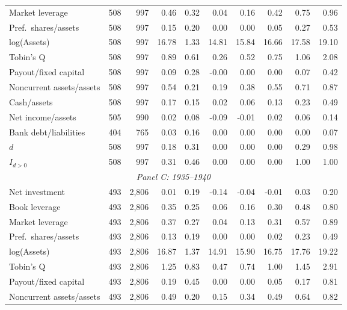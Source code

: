 \begin{table}[p]
\begin{tabular}{lrrrrrrrrr}
Market leverage             & 508 &   997 & 0.46 & 0.32 &  0.04 &  0.16 &  0.42 &  0.75 & 0.96 \\
Pref.\ shares/assets        & 508 &   997 & 0.15 & 0.20 &  0.00 &  0.00 &  0.05 &  0.27 & 0.53 \\
log(Assets)                 & 508 &   997 & 16.78& 1.33 & 14.81 & 15.84 & 16.66 & 17.58 & 19.10 \\
Tobin's Q                   & 508 &   997 & 0.89 & 0.61 &  0.26 &  0.52 &  0.75 &  1.06 & 2.08 \\
Payout/fixed capital        & 508 &   997 & 0.09 & 0.28 & -0.00 &  0.00 &  0.00 &  0.07 & 0.42 \\
Noncurrent assets/assets    & 508 &   997 & 0.54 & 0.21 &  0.19 &  0.38 &  0.55 &  0.71 & 0.87 \\
Cash/assets                 & 508 &   997 & 0.17 & 0.15 &  0.02 &  0.06 &  0.13 &  0.23 & 0.49 \\
Net income/assets           & 505 &   990 & 0.02 & 0.08 & -0.09 & -0.01 &  0.02 &  0.06 & 0.14 \\
Bank debt/liabilities       & 404 &   765 & 0.03 & 0.16 &  0.00 &  0.00 &  0.00 &  0.00 & 0.07 \\
$d$                         & 508 &   997 & 0.18 & 0.31 &  0.00 &  0.00 &  0.00 &  0.29 & 0.98 \\
$I_{d>0}$                   & 508 &   997 & 0.31 & 0.46 &  0.00 &  0.00 &  0.00 &  1.00 & 1.00 \\
\midrule
\multicolumn{10}{c}{\textit{Panel C: 1935--1940}}\\
\midrule
Net investment              & 493 & 2,806 & 0.01 & 0.19 & -0.14 & -0.04 & -0.01 &  0.03 & 0.20 \\
Book leverage               & 493 & 2,806 & 0.35 & 0.25 &  0.06 &  0.16 &  0.30 &  0.48 & 0.80 \\
Market leverage             & 493 & 2,806 & 0.37 & 0.27 &  0.04 &  0.13 &  0.31 &  0.57 & 0.89 \\
Pref.\ shares/assets        & 493 & 2,806 & 0.13 & 0.19 &  0.00 &  0.00 &  0.02 &  0.23 & 0.49 \\
log(Assets)                 & 493 & 2,806 & 16.87& 1.37 & 14.91 & 15.90 & 16.75 & 17.76 & 19.22 \\
Tobin's Q                   & 493 & 2,806 & 1.25 & 0.83 &  0.47 &  0.74 &  1.00 &  1.45 & 2.91 \\
Payout/fixed capital        & 493 & 2,806 & 0.19 & 0.45 &  0.00 &  0.00 &  0.05 &  0.17 & 0.81 \\
Noncurrent assets/assets    & 493 & 2,806 & 0.49 & 0.20 &  0.15 &  0.34 &  0.49 &  0.64 & 0.82 \\

\end{tabular}
\end{table}
